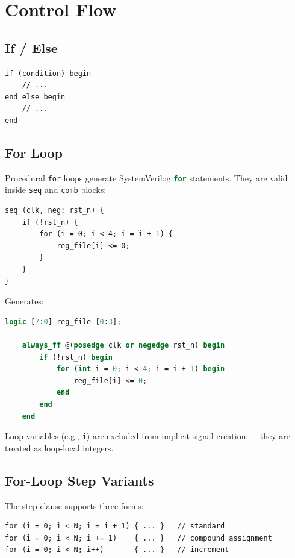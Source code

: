 \documentclass[lang=en,11pt]{elegantbook}
\newcommand{\code}[1]{\texttt{#1}}
\newcommand{\svinline}[1]{\lstinline[language=SystemVerilog]|#1|}
\begin{document}
\chapter{Control Flow}

\section{If / Else}

\begin{lstlisting}[language=Slip]
if (condition) begin
    // ...
end else begin
    // ...
end
\end{lstlisting}

\section{For Loop}

Procedural \code{for} loops generate SystemVerilog \svinline{for} statements. They are valid inside \code{seq} and \code{comb} blocks:

\begin{lstlisting}[language=Slip]
seq (clk, neg: rst_n) {
    if (!rst_n) {
        for (i = 0; i < 4; i = i + 1) {
            reg_file[i] <= 0;
        }
    }
}
\end{lstlisting}

Generates:

\begin{lstlisting}[language=SystemVerilog]
    logic [7:0] reg_file [0:3];

    always_ff @(posedge clk or negedge rst_n) begin
        if (!rst_n) begin
            for (int i = 0; i < 4; i = i + 1) begin
                reg_file[i] <= 0;
            end
        end
    end
\end{lstlisting}

Loop variables (e.g., \code{i}) are excluded from implicit signal creation --- they are treated as loop-local integers.

\section{For-Loop Step Variants}

The step clause supports three forms:

\begin{lstlisting}[language=Slip]
for (i = 0; i < N; i = i + 1) { ... }   // standard
for (i = 0; i < N; i += 1)    { ... }   // compound assignment
for (i = 0; i < N; i++)       { ... }   // increment
\end{lstlisting}
\end{document}

